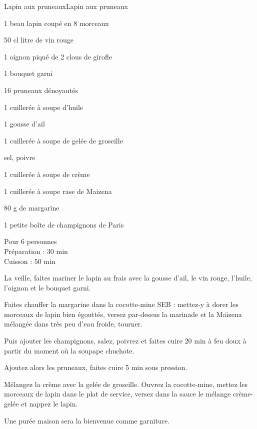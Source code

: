 \begin{recette}{Lapin aux pruneaux}{Lapin aux pruneaux}

\begin{ingredients}
1 beau lapin coupé en 8 morceaux\par
50 cl litre de vin rouge\par
1 oignon piqué de 2 clous de girofle\par
1 bouquet garni\par
16 pruneaux dénoyautés\par
1 cuillerée à soupe d’huile\par
1 gousse d’ail\par
1 cuillerée à soupe de gelée de groseille\par
sel, poivre\par
1 cuillerée à soupe de crème\par
1 cuillerée à soupe rase de Maizena\par
80 g de margarine\par
1 petite boîte de champignons de Paris\par
\end{ingredients}

\begin{infos}
Pour 6 personnes\\
Préparation : 30 min\\
Cuisson : 50 min\\
\end{infos}

\begin{etapes}
\item La veille, faites mariner le lapin au frais avec la gousse d’ail, le vin rouge, l’huile, l’oignon et le bouquet garni.
\item Faites chauffer la margarine dans la cocotte-mine SEB : mettez-y à dorer les morceaux de lapin bien égouttés, versez par-dessus la marinade et la Ma\"\i zena mélangée dans très peu d’eau froide, tourner.
\item Puis ajouter les champignons, salez, poivrez et faites cuire 20 min à feu doux à partir du moment où la soupape chuchote.
\item Ajoutez alors les pruneaux, faites cuire 5 min sous pression.
\item Mélangez la crème avec la gelée de groseille. Ouvrez la cocotte-mine, mettez les morceaux de lapin dans le plat de service, versez dans la sauce le mélange crème-gelée et nappez le lapin.
\end{etapes}

\begin{conseils}
Une purée maison sera la bienvenue comme garniture.
\end{conseils}

\end{recette}